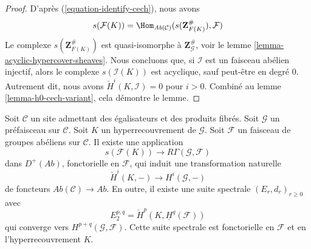\begin{proof}
D'après (\ref{equation-identify-cech}), nous avons
$$
s(\mathcal{F}(K))
=
\Hom_{\textit{Ab}(\mathcal{C})}(s(\mathbf{Z}_{F(K)}^\#), \mathcal{F})
$$
Le complexe $s(\mathbf{Z}_{F(K)}^\#)$ est quasi-isomorphe
à $\mathbf{Z}_\mathcal{G}^\#$, voir le
lemme \ref{lemma-acyclic-hypercover-sheaves}. Nous concluons
que, si $\mathcal{I}$ est un faisceau abélien injectif, alors
le complexe $s(\mathcal{I}(K))$ est acyclique, sauf peut-être en degré $0$.
Autrement dit, nous avons $\check{H}^i(K, \mathcal{I}) = 0$
pour $i > 0$. Combiné au lemme \ref{lemma-h0-cech-variant},
cela démontre le lemme.
\end{proof}

\begin{lemma}
\label{lemma-cech-spectral-sequence-variant}
Soit $\mathcal{C}$ un site admettant des égalisateurs et des produits fibrés.
Soit $\mathcal{G}$ un préfaisceau sur $\mathcal{C}$.
Soit $K$ un hyperrecouvrement de $\mathcal{G}$.
Soit $\mathcal{F}$ un faisceau de groupes abéliens sur $\mathcal{C}$.
Il existe une application
$$
s(\mathcal{F}(K)) \longrightarrow R\Gamma(\mathcal{G}, \mathcal{F})
$$
dans $D^{+}(\textit{Ab})$, fonctorielle en $\mathcal{F}$, qui induit
une transformation naturelle
$$
\check{H}^i(K, -) \longrightarrow H^i(\mathcal{G}, -)
$$
de foncteurs $\textit{Ab}(\mathcal{C}) \to \textit{Ab}$. En outre,
il existe une suite spectrale $(E_r, d_r)_{r \geq 0}$ avec
$$
E_2^{p, q} = \check{H}^p(K, \underline{H}^q(\mathcal{F}))
$$
qui converge vers $H^{p + q}(\mathcal{G}, \mathcal{F})$.
Cette suite spectrale est fonctorielle en $\mathcal{F}$ et
en l'hyperrecouvrement $K$.
\end{lemma}


